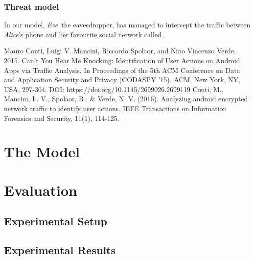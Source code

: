 \documentclass[a4paper,10pt]{report}
\newcommand\eve{\textit{Eve}}
\newcommand\alice{\textit{Alice}}
\begin{document}
\subsection{Threat model}
In our model, \eve\ the eavesdropper, has managed to intercept the traffic between \alice's phone and her favourite social network called 



\begin{thebibliography}{99}
Mauro Conti, Luigi V. Mancini, Riccardo Spolaor, and Nino Vincenzo Verde. 2015. Can't You Hear Me Knocking: Identification of User Actions on Android Apps via Traffic Analysis. In Proceedings of the 5th ACM Conference on Data and Application Security and Privacy (CODASPY '15). ACM, New York, NY, USA, 297-304. DOI: https://doi.org/10.1145/2699026.2699119
 Conti, M., Mancini, L. V., Spolaor, R., \& Verde, N. V. (2016). Analyzing android encrypted network traffic to identify user actions. IEEE Transactions on Information Forensics and Security, 11(1), 114-125.
\chapter{The Model}

\chapter{}

\chapter{Evaluation}
\section{Experimental Setup}
\section{Experimental Results}

\end{thebibliography}
\end{document}
